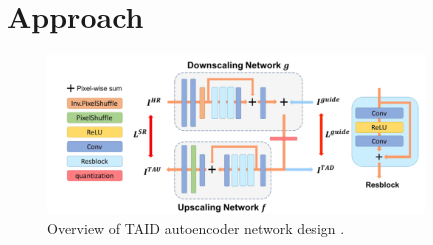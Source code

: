 \newpage
\section{Approach}
\label{sec:Approach}


\begin{figure}[!htbp]
	\centering
	\includegraphics[width=10cm]{figures/tad_overview}
	\caption{Overview of TAID autoencoder network design \cite{TAID}.}
  \label{fig:tad_overview}
\end{figure}


